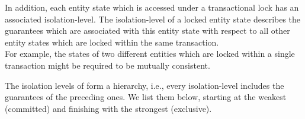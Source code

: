\documentclass[a4paper, 10pt]{book}
\begin{document}
                            In addition, each entity state which is accessed under a transactional
                            lock has an associated isolation-level. The isolation-level of a locked
                            entity state describes the guarantees which are associated with this
                            entity state with respect to all other entity states which are locked
                            within the same transaction.\\
                            For example, the states of two different entities which are locked
                            within a single transaction might be required to be mutually
                            consistent.


                            The isolation levels of \SYNEIGHT form a hierarchy, i.e., every
                            isolation-level includes the guarantees of the preceding ones. We
                            list them below, starting at the weakest (committed) and finishing
                            with the strongest (exclusive).
\end{document}
